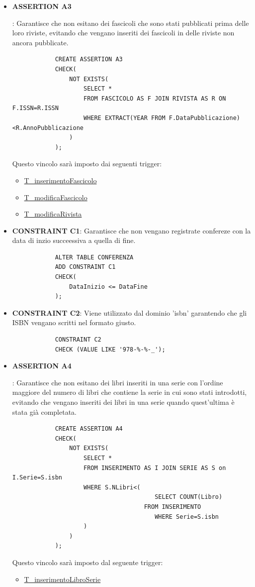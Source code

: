 \documentclass{article}
\begin{document}
\begin{itemize}
    \item \hypertarget{assertion3}{\textbf{ASSERTION A3}}: Garantisce che non esitano dei fascicoli che sono stati pubblicati prima delle loro riviste, evitando che vengano inseriti dei fascicoli in delle riviste non ancora pubblicate.
        \begin{verbatim}
            CREATE ASSERTION A3
            CHECK(
                NOT EXISTS(
                    SELECT *
                    FROM FASCICOLO AS F JOIN RIVISTA AS R ON F.ISSN=R.ISSN
                    WHERE EXTRACT(YEAR FROM F.DataPubblicazione)<R.AnnoPubblicazione  
                )
            );
        \end{verbatim}
    Questo vincolo sarà imposto dai seguenti trigger:
        \begin{itemize}
            \item \hyperlink{t7}{T\_inserimentoFascicolo}
            \item \hyperlink{t6}{T\_modificaFascicolo}
            \item \hyperlink{t9}{T\_modificaRivista}
        \end{itemize}    

    \item \textbf{CONSTRAINT C1}: Garantisce che non vengano registrate confereze con la data di inzio succeessiva a quella di fine.
        \begin{verbatim}
            ALTER TABLE CONFERENZA
            ADD CONSTRAINT C1
            CHECK(
                DataInizio <= DataFine
            );
        \end{verbatim}
        
    \item \textbf{CONSTRAINT C2}: Viene utilizzato dal dominio 'isbn' garantendo che gli ISBN vengano scritti nel formato giusto.
        \begin{verbatim}
            CONSTRAINT C2
            CHECK (VALUE LIKE '978-%-%-_');
        \end{verbatim}
    
    \item \hypertarget{assertion4}{\textbf{ASSERTION A4}}: Garantisce che non esitano dei libri inseriti in una serie con l'ordine maggiore del numero di libri che contiene la serie in cui sono stati introdotti, evitando che vengano inseriti dei libri in una serie quando quest'ultima è stata già completata.
        \begin{verbatim}
            CREATE ASSERTION A4
            CHECK(
                NOT EXISTS(
                    SELECT *
                    FROM INSERIMENTO AS I JOIN SERIE AS S on I.Serie=S.isbn
                    WHERE S.NLibri<(
                    	                SELECT COUNT(Libro)
                                     FROM INSERIMENTO
                    	                WHERE Serie=S.isbn
                    )
                )
            );
        \end{verbatim}
    Questo vincolo sarà imposto dal seguente trigger:
        \begin{itemize}
            \item \hyperlink{t10}{T\_inserimentoLibroSerie}
        \end{itemize}
        

\end{itemize}
\end{document}
